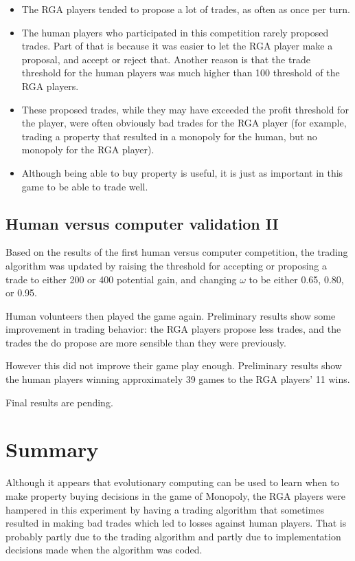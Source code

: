 \begin{itemize}
  \item {The RGA players tended to propose a lot of trades, as often
  as once per turn.}
  \item {The human players who participated in this competition rarely proposed
  trades. Part of that is because it was easier to let the RGA player make a
  proposal, and accept or reject that. Another reason is that the trade
  threshold for the human players was much higher than 100 threshold of the RGA
  players.}
  \item {These proposed trades, while they may have exceeded the profit
  threshold for the player, were often obviously bad trades for the RGA player
  (for example, trading a property that resulted in a monopoly for the human,
  but no monopoly for the RGA player).}
  \item {Although being able to buy property is useful, it is just as important
  in this game to be able to trade well.}
\end{itemize}

 \subsection{Human versus computer validation II}

 Based on the results of the first human versus computer competition, the trading
 algorithm was updated by raising the threshold for accepting or proposing a trade
 to either 200 or 400 potential gain, and changing \(\omega\) to be either
 0.65, 0.80, or 0.95.

 Human volunteers then played the game again. Preliminary results show some
 improvement in trading behavior: the RGA players propose less trades, and the
 trades the do propose are more sensible than they were previously.

 However this did not improve their game play enough. Preliminary results show
 the human players winning approximately 39 games to the RGA players' 11 wins.

 Final results are pending.

 \section{Summary}

 Although it appears that evolutionary computing can be used to learn when to
 make property buying decisions in the game of Monopoly, the RGA players were
 hampered in this experiment by having a trading algorithm that sometimes
 resulted in making bad trades which led to losses against human players. That
 is probably partly due to the trading algorithm and partly due to
 implementation decisions made when the algorithm was coded.
